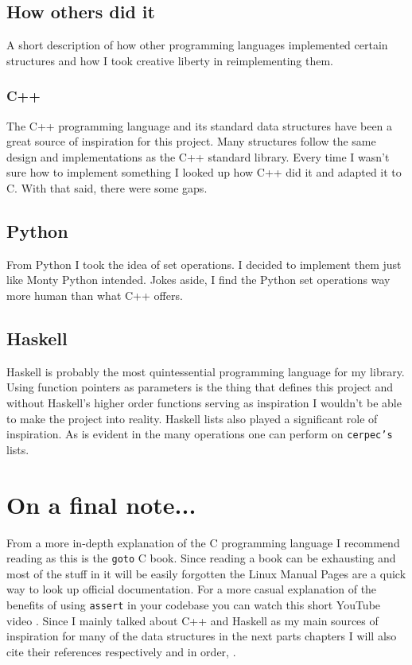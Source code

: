 \subsection{How others did it}

A short description of how other programming languages implemented certain structures and how I took creative liberty in reimplementing them.

\subsubsection{C++}

The C++ programming language and its standard data structures have been a great source of inspiration for this project. Many structures follow the same design and implementations as the C++ standard library. Every time I wasn't sure how to implement something I looked up how C++ did it and adapted it to C. With that said, there were some gaps.

\subsection{Python}

From Python I took the idea of set operations. I decided to implement them just like Monty Python intended. Jokes aside, I find the Python set operations way more human than what C++ offers.

\subsection{Haskell}

Haskell is probably the most quintessential programming language for my library. Using function pointers as parameters is the thing that defines this project and without Haskell's higher order functions serving as inspiration I wouldn't be able to make the project into reality. Haskell lists also played a significant role of inspiration. As is evident in the many operations one can perform on \texttt{cerpec's} lists.

\section{On a final note...}

From a more in-depth explanation of the C programming language I recommend reading \cite{kernighan1988c} as this is the \texttt{goto} C book. Since reading a book can be exhausting and most of the stuff in it will be easily forgotten the Linux Manual Pages \cite{linuxManPage} are a quick way to look up official documentation. For a more casual explanation of the benefits of using \texttt{assert} in your codebase you can watch this short YouTube video \cite{lewboskiAssert}. Since I mainly talked about C++ and Haskell as my main sources of inspiration for many of the data structures in the next parts chapters I will also cite their references respectively and in order, \cite{cplusplusReference, nriPreludeList}.

\printbibliography[heading=subbibintoc, title={Further reading}]
